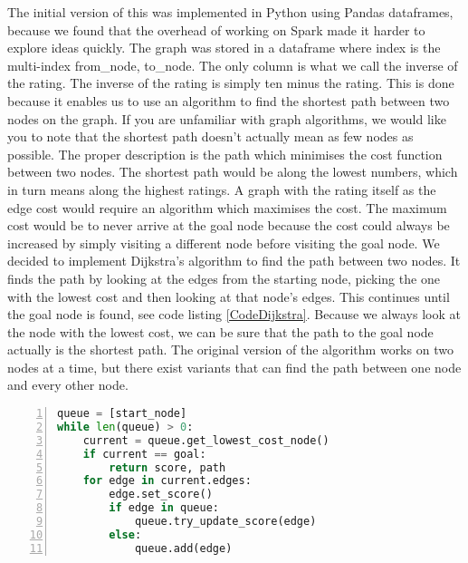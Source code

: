 The initial version of this was implemented in Python using Pandas dataframes, because we found that the overhead of working on Spark made it harder to explore ideas quickly. The graph was stored in a dataframe where index is the multi-index from\_node, to\_node. The only column is what we call the inverse of the rating. The inverse of the rating is simply ten minus the rating. This is done because it enables us to use an algorithm to find the shortest path between two nodes on the graph. If you are unfamiliar with graph algorithms, we would like you to note that the shortest path doesn’t actually mean as few nodes as possible. The proper description is the path which minimises the cost function between two nodes. The shortest path would be along the lowest numbers, which in turn means along the highest ratings. A graph with the rating itself as the edge cost would require an algorithm which maximises the cost. The maximum cost would be to never arrive at the goal node because the cost could always be increased by simply visiting a different node before visiting the goal node. We decided to implement Dijkstra’s algorithm to find the path between two nodes. It finds the path by looking at the edges from the starting node, picking the one with the lowest cost and then looking at that node’s edges. This continues until the goal node is found, see code listing \ref{CodeDijkstra}. Because we always look at the node with the lowest cost, we can be sure that the path to the goal node actually is the shortest path. The original version of the algorithm works on two nodes at a time, but there exist variants that can find the path between one node and every other node.



\begin{lstlisting}[float=h, language=Python, caption=Dijkstra pseudocode, label=CodeDijkstra, numbers=left]
queue = [start_node]
while len(queue) > 0:
    current = queue.get_lowest_cost_node()
    if current == goal:
        return score, path
    for edge in current.edges:
        edge.set_score()
        if edge in queue:
            queue.try_update_score(edge)
        else:
            queue.add(edge)
\end{lstlisting}



